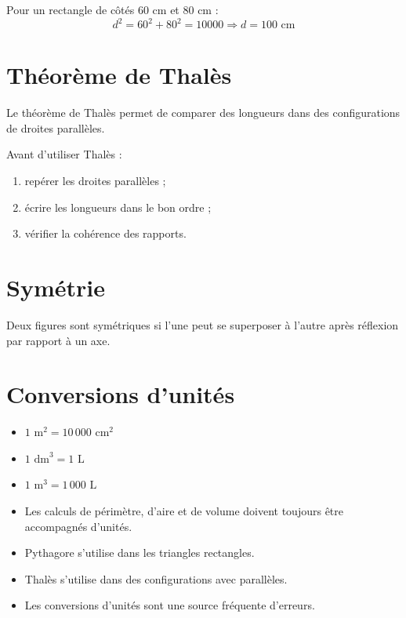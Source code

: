 \documentclass[11pt,a4paper,twoside]{book}
\begin{document}
\begin{exemplebox}
Pour un rectangle de côtés \(60\) cm et \(80\) cm :
\[
d^2=60^2+80^2=10000
\Rightarrow d=100\text{ cm}
\]
\end{exemplebox}

\section{Théorème de Thalès}
\begin{definitionbox}
Le théorème de Thalès permet de comparer des longueurs dans des configurations de droites parallèles.
\end{definitionbox}

\begin{methodebox}
Avant d'utiliser Thalès :
\begin{enumerate}
\item repérer les droites parallèles ;
\item écrire les longueurs dans le bon ordre ;
\item vérifier la cohérence des rapports.
\end{enumerate}
\end{methodebox}

\section{Symétrie}
\begin{definitionbox}
Deux figures sont symétriques si l'une peut se superposer à l'autre après réflexion par rapport à un axe.
\end{definitionbox}

\section{Conversions d'unités}
\begin{attentionbox}
\begin{itemize}
\item \(1\text{ m}^2 = 10\,000\text{ cm}^2\)
\item \(1\text{ dm}^3 = 1\text{ L}\)
\item \(1\text{ m}^3 = 1\,000\text{ L}\)
\end{itemize}
\end{attentionbox}

\begin{retenirbox}
\begin{itemize}
\item Les calculs de périmètre, d'aire et de volume doivent toujours être accompagnés d'unités.
\item Pythagore s'utilise dans les triangles rectangles.
\item Thalès s'utilise dans des configurations avec parallèles.
\item Les conversions d'unités sont une source fréquente d'erreurs.
\end{itemize}
\end{retenirbox}
\end{document}
